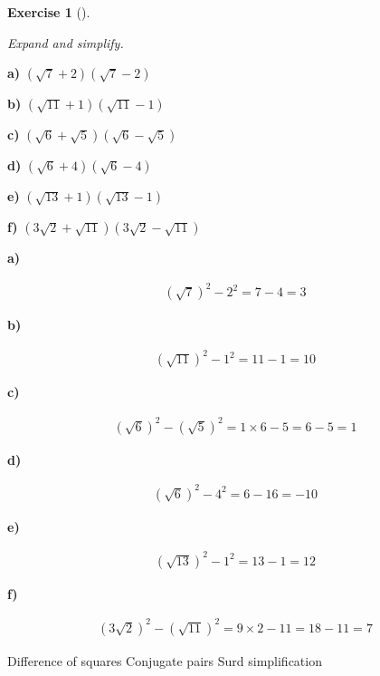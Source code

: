 \documentclass[
  letterpaper,
  DIV=11,
  numbers=noendperiod]{scrreprt}
\theoremstyle{definition}
\newtheorem{exercise}{Exercise}[chapter]
\theoremstyle{remark}
\begin{document}
\begin{exercise}[]\protect\hypertarget{exr-u2-49}{}\label{exr-u2-49}

\emph{Expand and simplify.}

\textbf{a)} \(\displaystyle (\sqrt{7}+2)(\sqrt{7}-2)\)

\textbf{b)} \(\displaystyle (\sqrt{11}+1)(\sqrt{11}-1)\)

\textbf{c)} \(\displaystyle (\sqrt{6}+\sqrt{5})(\sqrt{6}-\sqrt{5})\)

\textbf{d)} \(\displaystyle (\sqrt{6}+4)(\sqrt{6}-4)\)

\textbf{e)} \(\displaystyle (\sqrt{13}+1)(\sqrt{13}-1)\)

\textbf{f)} \(\displaystyle (3\sqrt{2}+\sqrt{11})(3\sqrt{2}-\sqrt{11})\)

\begin{tcolorbox}[enhanced jigsaw, opacitybacktitle=0.6, coltitle=black, arc=.35mm, colframe=quarto-callout-tip-color-frame, colback=white, bottomrule=.15mm, left=2mm, colbacktitle=quarto-callout-tip-color!10!white, titlerule=0mm, opacityback=0, title=\textcolor{quarto-callout-tip-color}{\faLightbulb}\hspace{0.5em}{🔍 View Solutions}, leftrule=.75mm, breakable, rightrule=.15mm, bottomtitle=1mm, toptitle=1mm, toprule=.15mm]

\textbf{a)}

\[
\begin{aligned}
(\sqrt{7})^2 - 2^2 = 7 - 4 = 3
\end{aligned}
\]

\textbf{b)}

\[
\begin{aligned}
(\sqrt{11})^2 - 1^2 = 11 - 1 = 10
\end{aligned}
\]

\textbf{c)}

\[
\begin{aligned}
(\sqrt{6})^2 - (\sqrt{5})^2 = 1\times 6 - 5 = 6 - 5 = 1
\end{aligned}
\]

\textbf{d)}

\[
\begin{aligned}
(\sqrt{6})^2 - 4^2 = 6 - 16 = -10
\end{aligned}
\]

\textbf{e)}

\[
\begin{aligned}
(\sqrt{13})^2 - 1^2 = 13 - 1 = 12
\end{aligned}
\]

\textbf{f)}

\[
\begin{aligned}
(3\sqrt{2})^2 - (\sqrt{11})^2 = 9\times 2 - 11 = 18 - 11 = 7
\end{aligned}
\]

\end{tcolorbox}

{Difference of squares} {Conjugate pairs} {Surd simplification}

\end{exercise}
\end{document}
